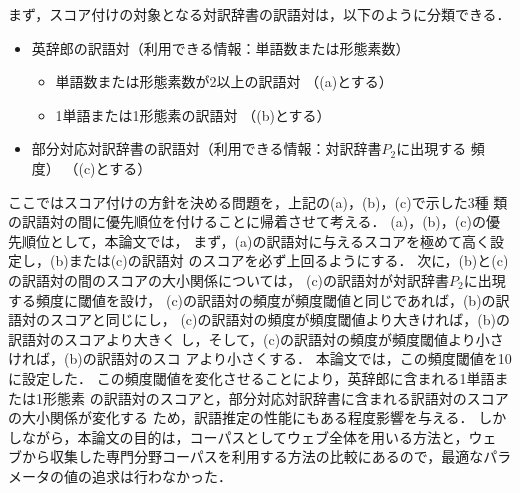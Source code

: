 \documentclass[japanese]{jnlp_1.3a}
\begin{document}
まず，スコア付けの対象となる対訳辞書の訳語対は，以下のように分類できる．
\begin{itemize}
 \item 英辞郎の訳語対（利用できる情報：単語数または形態素数）
       \begin{itemize}
	\item 単語数または形態素数が2以上の訳語対 （(a)とする）
	\item 1単語または1形態素の訳語対 （(b)とする）
       \end{itemize}
 \item 部分対応対訳辞書の訳語対（利用できる情報：対訳辞書$P_2$に出現する
       頻度） （(c)とする）
\end{itemize}
ここではスコア付けの方針を決める問題を，上記の(a)，(b)，(c)で示した3種
類の訳語対の間に優先順位を付けることに帰着させて考える．
(a)，(b)，(c)の優先順位として，本論文では，
まず，(a)の訳語対に与えるスコアを極めて高く設定し，(b)または(c)の訳語対
のスコアを必ず上回るようにする．
次に，(b)と(c)の訳語対の間のスコアの大小関係については，
(c)の訳語対が対訳辞書$P_2$に出現する頻度に閾値を設け，
(c)の訳語対の頻度が頻度閾値と同じであれば，(b)の訳語対のスコアと同じにし，
(c)の訳語対の頻度が頻度閾値より大きければ，(b)の訳語対のスコアより大きく
し，そして，(c)の訳語対の頻度が頻度閾値より小さければ，(b)の訳語対のスコ
アより小さくする．
本論文では，この頻度閾値を10に設定した．
この頻度閾値を変化させることにより，英辞郎に含まれる1単語または1形態素
の訳語対のスコアと，部分対応対訳辞書に含まれる訳語対のスコアの大小関係が変化する
ため，訳語推定の性能にもある程度影響を与える．
しかしながら，本論文の目的は，コーパスとしてウェブ全体を用いる方法と，ウェ
ブから収集した専門分野コーパスを利用する方法の比較にあるので，最適なパラ
メータの値の追求は行わなかった．
\end{document}
